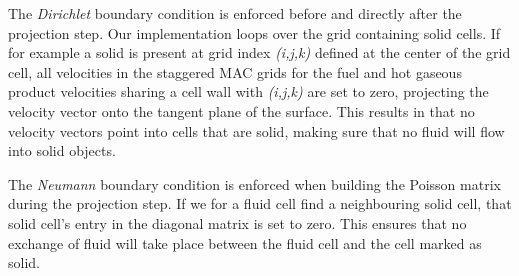 The \emph{Dirichlet} boundary condition is enforced before and directly after the projection step. Our implementation loops over the grid containing solid cells. If for example a solid is present at grid index \emph{(i,j,k)} defined at the center of the grid cell, all velocities in the staggered MAC grids for the fuel and hot gaseous product velocities sharing a cell wall with \emph{(i,j,k)} are set to zero, projecting the velocity vector onto the tangent plane of the surface. This results in that no velocity vectors point into cells that are solid, making sure that no fluid will flow into solid objects.

The \emph{Neumann} boundary condition is enforced when building the Poisson matrix during the projection step. If we for a fluid cell find a neighbouring solid cell, that solid cell's entry in the diagonal matrix is set to zero. This ensures that no exchange of fluid will take place between the fluid cell and the cell marked as solid.